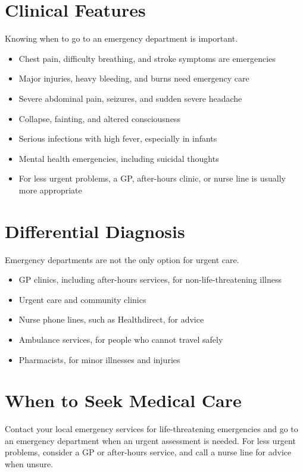 \section*{Clinical Features}
Knowing when to go to an emergency department is important.
\begin{itemize}
    \item Chest pain, difficulty breathing, and stroke symptoms are emergencies
    \item Major injuries, heavy bleeding, and burns need emergency care
    \item Severe abdominal pain, seizures, and sudden severe headache
    \item Collapse, fainting, and altered consciousness
    \item Serious infections with high fever, especially in infants
    \item Mental health emergencies, including suicidal thoughts
    \item For less urgent problems, a GP, after-hours clinic, or nurse line is usually more appropriate
\end{itemize}

\section*{Differential Diagnosis}
Emergency departments are not the only option for urgent care.
\begin{itemize}
    \item GP clinics, including after-hours services, for non-life-threatening illness
    \item Urgent care and community clinics
    \item Nurse phone lines, such as Healthdirect, for advice
    \item Ambulance services, for people who cannot travel safely
    \item Pharmacists, for minor illnesses and injuries
\end{itemize}

\section*{When to Seek Medical Care}
Contact your local emergency services for life-threatening emergencies and go to an emergency department when an urgent assessment is needed. For less urgent problems, consider a GP or after-hours service, and call a nurse line for advice when unsure.

